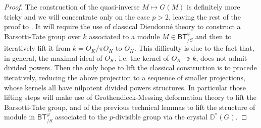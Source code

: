 \begin{proof}
The construction of the quasi-inverse $M \mapsto G(M)$
is definitely more tricky and we will concentrate only on
the case $p > 2$, leaving the rest of the proof to \cite{Kisin}.
It will require the use of classical Dieudonné theory to construct a
Barsotti-Tate group over $k$ associated to a module $M \in \mathsf{BT}^{\varphi}_{/S}$
and then to iteratively lift it from $k = O_K/\pi O_K$ to $O_K$.
This difficulty is due to the fact that, in general, the maximal
ideal of $O_K$, i.e. the kernel of $O_K \twoheadrightarrow k$, 
does not admit divided powers.
Then the only hope to lift the classical construction is to
procede iteratively, reducing the above projection to a sequence of
smaller projections, whose kernels all have nilpotent divided powers structures.
In particular those lifting steps will make use of Grothendieck-Messing
deformation theory to lift the Barsotti-Tate group, and of the previous
technical lemmas to lift the structure of module in $\mathsf{BT}^{\varphi}_{/S}$
associated to the $p$-divisible group via the crystal $\mathbb{D}^*(G)$.



\end{proof}
